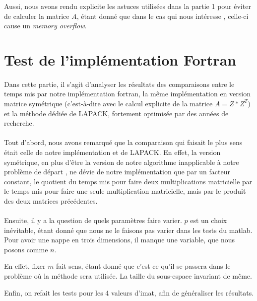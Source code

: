 \documentclass[a4paper,12pt]{article}
\begin{document}
    Aussi, nous avons rendu explicite les astuces utilisées dans la partie 1 pour
    éviter de calculer la matrice $A$, étant donné que dans le cas qui nous intéresse
    , celle-ci cause un \emph{memory overflow}.

\newpage
\section{Test de l'implémentation Fortran}

    \paragraph{}
    Dans cette partie, il s'agit d'analyser les résultats des comparaisons
    entre le temps mis par notre implémentation fortran, la même implémentation
    en version matrice symétrique (c'est-à-dire avec le calcul explicite de la
    matrice $A = Z*Z^T$) et la méthode dédiée de LAPACK, fortement optimisée
    par des années de recherche.

    \paragraph{}
    Tout d'abord, nous avons remarqué que la comparaison qui faisait le plus sens
    était celle de notre implémentation et de LAPACK. En effet, la version symétrique,
    en plus d'être la version de notre algorithme inapplicable à notre problème de départ
    , ne dévie de notre implémentation que par un facteur constant, le quotient du temps
    mis pour faire deux multiplications matricielle par le temps mis pour faire une seule
    multiplication matricielle, mais par le produit des deux matrices précédentes.

    \paragraph{}
    Ensuite, il y a la question de quels paramètres faire varier. $p$ est un choix
    inévitable, étant donné que nous ne le faisons pas varier dans les tests du matlab.
    Pour avoir une nappe en trois dimensions, il manque une variable, que nous
    posons comme $n$.

    En effet, fixer $m$ fait sens, étant donné que c'est ce qu'il se passera dans le
    problème où la méthode sera utilisée. La taille du sous-espace invariant de même.

    Enfin, on refait les tests pour les 4 valeurs d'imat, afin de généraliser les
    résultats.
\end{document}
